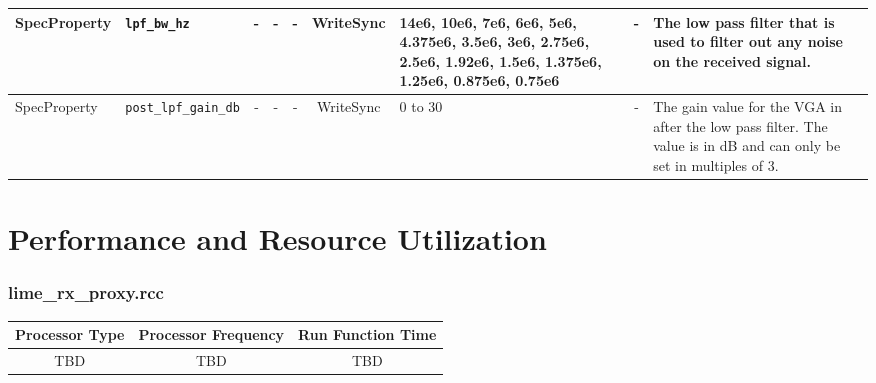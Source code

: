\documentclass{article}
\def\comp{lime\_rx\_proxy}
\begin{document}
\begin{landscape}
\begin{scriptsize}
\begin{tabular}{|p{2cm}|p{3cm}|c|c|c|c|p{2.5cm}|c|p{7cm}|}
			\hline
			SpecProperty & \verb+lpf_bw_hz+              & -    & -        & -          & WriteSync      & 14e6, 10e6, 7e6, 6e6, 5e6, 4.375e6, 3.5e6, 3e6, 2.75e6, 2.5e6, 1.92e6, 1.5e6, 1.375e6, 1.25e6, 0.875e6, 0.75e6 & -       & The low pass filter that is used to filter out any noise on the received signal.                                                                                                                                                                                    \\
			\hline
			SpecProperty & \verb+post_lpf_gain_db+       & -    & -        & -          & WriteSync      & 0 to 30                                                                                                        & -       & The gain value for the VGA in after the low pass filter. The value is in dB and can only be set in multiples of 3.                                                                                                                                                  \\
			\hline
		\end{tabular}
	\end{scriptsize}
\end{landscape}

\section*{Performance and Resource Utilization}
\subsubsection*{\comp.rcc}
\begin{scriptsize}
	\begin{tabular}{|c|c|c|}
		\hline
		\rowcolor{blue}
		Processor Type & Processor Frequency & Run Function Time \\
		\hline
		TBD            & TBD                 & TBD               \\
		\hline
	\end{tabular}
\end{scriptsize}
\end{document}
